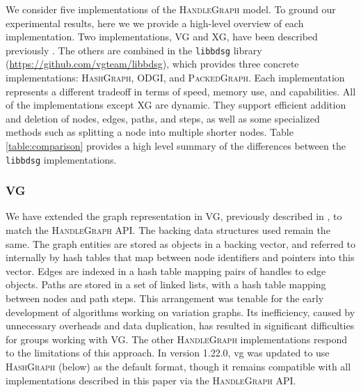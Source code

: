 \documentclass[11pt]{ucthesis}
\begin{document}
We consider five implementations of the \textsc{HandleGraph} model.
To ground our experimental results, here we we provide a high-level overview of each implementation.
Two implementations, \textsc{VG} and \textsc{XG}, have been described previously \cite{garrison2018variation,Garrison_2019}.
The others are combined in the \texttt{libbdsg} library (\url{https://github.com/vgteam/libbdsg}), which provides three concrete implementations: \textsc{HashGraph}, \textsc{ODGI}, and \textsc{PackedGraph}.
Each implementation represents a different tradeoff in terms of speed, memory use, and capabilities.
All of the implementations except \textsc{XG} are dynamic.
They support efficient addition and deletion of nodes, edges, paths, and steps, as well as some specialized methods such as splitting a node into multiple shorter nodes.
Table \ref{table:comparison} provides a high level summary of the differences between the \texttt{libbdsg} implementations.

\subsubsection{\textsc{VG}}

We have extended the graph representation in \textsc{VG}, previously described in \cite{garrison2018variation}, to match the \textsc{HandleGraph} API.
The backing data structures used remain the same.
The graph entities are stored as objects in a backing vector, and referred to internally by hash tables that map between node identifiers and pointers into this vector.
Edges are indexed in a hash table mapping pairs of handles to edge objects.
Paths are stored in a set of linked lists, with a hash table mapping between nodes and path steps.
This arrangement was tenable for the early development of algorithms working on variation graphs.
Its inefficiency, caused by unnecessary overheads and data duplication, has resulted in significant difficulties for groups working with \textsc{VG}.
The other \textsc{HandleGraph} implementations respond to the limitations of this approach.
In version 1.22.0, vg was updated to use \textsc{HashGraph} (below) as the default format, though it remains compatible with all implementations described in this paper via the \textsc{HandleGraph} API.

\end{document}
